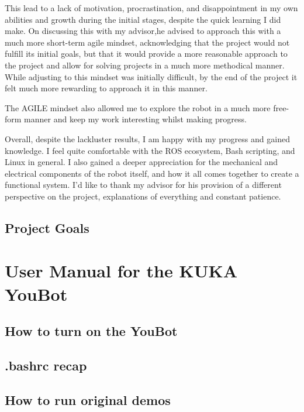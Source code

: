 \documentclass[a4paper, 12pt]{article}
\begin{document}
    
    This lead to a lack of motivation, procrastination, and disappointment in my own abilities and growth during the initial stages, despite the quick learning I did make. On discussing this with my advisor,he advised to approach this with a much more short-term agile mindset, acknowledging that the project would not fulfill its initial goals, but that it would provide a more reasonable approach to the project and allow for solving projects in a much more methodical manner. While adjusting to this mindset was initially difficult, by the end of the project it felt much more rewarding to approach it in this manner. 

    The AGILE mindset also allowed me to explore the robot in a much more free-form manner and keep my work interesting whilst making progress. 

    Overall, despite the lackluster results, I am happy with my progress and gained knowledge. I feel quite comfortable with the ROS ecosystem, Bash scripting, and Linux in general. I also gained a deeper appreciation for the mechanical and electrical components of the robot itself, and how it all comes together to create a functional system. I'd like to thank my advisor for his provision of a different perspective on the project, explanations of everything and constant patience. 




    \subsection{Project Goals}


    \newpage

    \nocite{*}
    \printbibliography

    \newpage

    \appendix


    \section{User Manual for the KUKA YouBot}

    \subsection{
     How to turn on the YouBot
    }

    \subsection{.bashrc recap}

    \subsection{How to run original demos}

    
    
\end{document}
